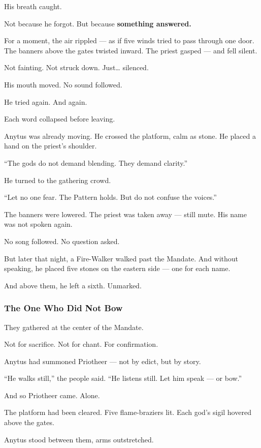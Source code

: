 \documentclass[12pt]{article}
\begin{document}
His breath caught.

Not because he forgot.  
But because \textbf{something answered.}

For a moment, the air rippled — as if five winds tried to pass through one door.  
The banners above the gates twisted inward.  
The priest gasped — and fell silent.

Not fainting.  
Not struck down.  
Just… silenced.

His mouth moved.  
No sound followed.

He tried again.  
And again.

Each word collapsed before leaving.

Anytus was already moving.  
He crossed the platform, calm as stone.  
He placed a hand on the priest’s shoulder.

 “The gods do not demand blending.  
 They demand clarity.”

He turned to the gathering crowd.

 “Let no one fear.  
 The Pattern holds.  
 But do not confuse the voices.”

The banners were lowered.  
The priest was taken away — still mute.  
His name was not spoken again.

No song followed.  
No question asked.

But later that night, a Fire-Walker walked past the Mandate.  
And without speaking, he placed five stones on the eastern side —  
one for each name.

And above them, he left a sixth.  
Unmarked.

\dotfill

\subsubsection{The One Who Did Not Bow}

They gathered at the center of the Mandate.

Not for sacrifice.  
Not for chant.  
For confirmation.

Anytus had summoned Priotheer — not by edict,  
but by story.

 “He walks still,” the people said.  
 “He listens still.  
 Let him speak — or bow.”

And so Priotheer came.  
Alone.

The platform had been cleared.  
Five flame-braziers lit.  
Each god’s sigil hovered above the gates.

Anytus stood between them, arms outstretched.
\end{document}

